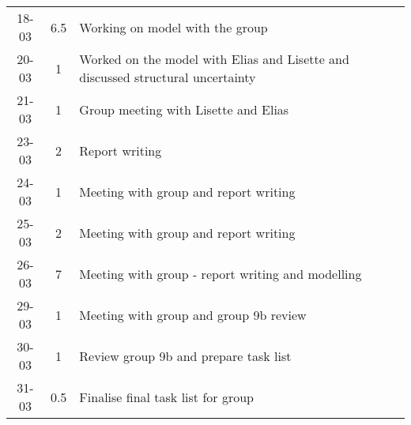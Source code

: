 \begin{longtable}[c]{c|c|m{35em}}
 18-03 & 6.5  & Working on model with the group \\
 20-03 & 1 & Worked on the model with Elias and Lisette and discussed structural uncertainty \\
 21-03 & 1 & Group meeting with Lisette and Elias\\
 23-03 & 2 & Report writing\\
 24-03 & 1 & Meeting with group and report writing\\
 25-03 & 2 & Meeting with group and report writing\\
 26-03 & 7 & Meeting with group - report writing and modelling\\
 29-03 & 1 & Meeting with group and group 9b review\\
 30-03 & 1 & Review group 9b and prepare task list\\
 31-03 & 0.5 & Finalise final task list for group\\
 

\end{longtable}

